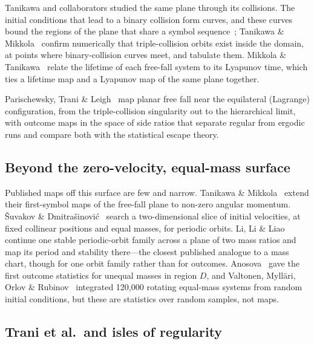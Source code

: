 \documentclass[11pt,a4paper]{article}
\begin{document}
Tanikawa and collaborators studied the same plane through its collisions.  The initial
conditions that lead to a binary collision form curves, and these curves bound the regions of
the plane that share a symbol sequence~\cite{tanikawa1995,tanikawa2008,tanikawa2015}; Tanikawa
\& Mikkola~\cite{tanikawa2021} confirm numerically that triple-collision orbits exist inside the
domain, at points where binary-collision curves meet, and tabulate them.  Mikkola \&
Tanikawa~\cite{mikkola2007} relate the lifetime of each free-fall system to its Lyapunov time,
which ties a lifetime map and a Lyapunov map of the same plane together.

Parischewsky, Trani \& Leigh~\cite{parischewsky2023} map planar free fall near the equilateral
(Lagrange) configuration, from the triple-collision singularity out to the hierarchical limit,
with outcome maps in the space of side ratios that separate regular from ergodic runs and compare
both with the statistical escape theory.

\subsection{Beyond the zero-velocity, equal-mass surface}

Published maps off this surface are few and narrow.  Tanikawa \&
Mikkola~\cite{tanikawa2008} extend their first-symbol maps of the free-fall plane to non-zero
angular momentum.  \v{S}uvakov \& Dmitra\v{s}inovi\'{c}~\cite{suvakov2013} search a
two-dimensional slice of initial velocities, at fixed collinear positions and equal masses, for
periodic orbits.  Li, Li \& Liao~\cite{lili2020} continue one stable periodic-orbit family across
a plane of two mass ratios and map its period and stability there---the closest published
analogue to a mass chart, though for one orbit family rather than for outcomes.  Anosova~\cite{anosova1969}
gave the first outcome statistics for unequal masses in region $D$, and Valtonen, Myll\"{a}ri,
Orlov \& Rubinov~\cite{valtonen2005} integrated 120,000 rotating equal-mass systems from random
initial conditions, but these are statistics over random samples, not maps.

\subsection{Trani et al.\ and isles of regularity}
\end{document}
